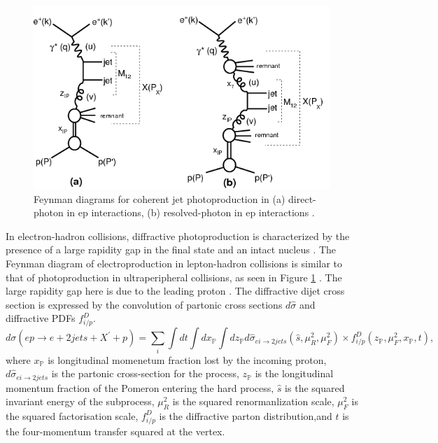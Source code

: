 \begin{figure}[]
\begin{centering}
\includegraphics[width=6in]{Chapter1/importfigs/h1_2015_feyn.png}
\par\end{centering}
\caption{Feynman diagrams for coherent jet photoproduction in (a) direct-photon in ep interactions, (b) resolved-photon in ep interactions \cite{Andreev:2015cwa}. \label{fig:feynmanUPC1}}
\end{figure}

In electron-hadron collisions, diffractive photoproduction is characterized by the presence of a large rapidity gap in the final state and an intact nucleus \cite{Frankfurt:2006tp,Alexa:2013xxa,Aktas:2006qs}. The Feynman diagram of electroproduction in lepton-hadron collisions is similar to that of photoproduction in ultraperipheral collisions, as seen in Figure \ref{fig:feynmanUPC1} \cite{Andreev:2015cwa}. The large rapidity gap here is due to the leading proton \cite{Aaron:2010aa}. The diffractive dijet cross section is expressed by the convolution of partonic cross sections $d\hat{\sigma}$ and diffractive PDFs $f^D_{i/p}$.
\begin{equation}
d\sigma (ep \rightarrow e + 2 jets + X^{'} + p) = \sum_{i} \int dt \int dx_\mathbb{P} \int dz_\mathbb{P}d\hat{\sigma}_{ei\rightarrow 2jets}(\hat{s},\mu^2_R,\mu^2_F)\times f^D_{i/p}(z_\mathbb{P},\mu^2_F,x_\mathbb{P},t) ,
\end{equation}
where $x_\mathbb{P}$ is longitudinal momenetum fraction lost by the incoming proton, $d\hat{\sigma}_{ei\rightarrow 2jets}$ is the partonic cross-section for the process, $z_\mathbb{P}$ is the longitudinal momentum fraction of the Pomeron entering the hard process, $\hat{s}$ is the squared invariant energy of the subprocess, $\mu^2_R$ is the squared renormanlization scale, $\mu^2_F$ is the squared factorisation scale, $f^D_{i/p}$ is the diffractive parton distribution,and $t$ is the four-momentum transfer squared at the vertex. 

